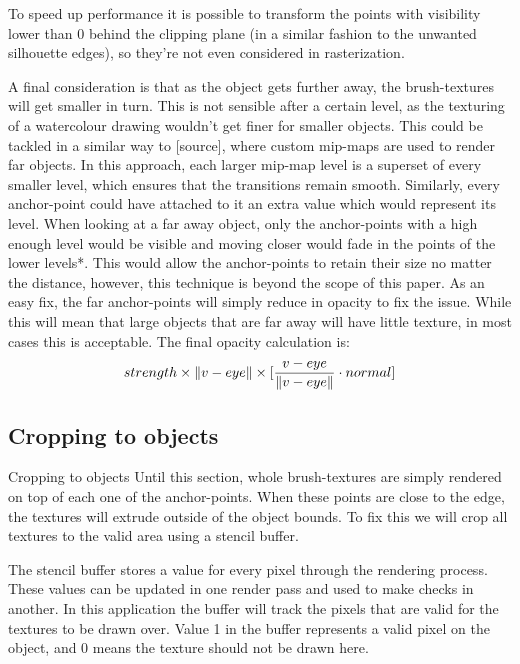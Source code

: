 \documentclass[a4paper, 12pt]{article}
\DeclarePairedDelimiter{\norm}{\lVert}{\rVert}
\begin{document}
To speed up performance it is possible to transform the points with visibility lower than 0 behind the clipping plane (in a similar fashion to the unwanted silhouette edges), so they're not even considered in rasterization.

A final consideration is that as the object gets further away, the brush-textures will get smaller in turn. This is not sensible after a certain level, as the texturing of a watercolour drawing wouldn't get finer for smaller objects. This could be tackled in a similar way to [source], where custom mip-maps are used to render far objects. In this approach, each larger mip-map level is a superset of every smaller level, which ensures that the transitions remain smooth. Similarly, every anchor-point could have attached to it an extra value which would represent its level. When looking at a far away object, only the anchor-points with a high enough level would be visible and moving closer would fade in the points of the lower levels*. This would allow the anchor-points to retain their size no matter the distance, however, this technique is beyond the scope of this paper. As an easy fix, the far anchor-points will simply reduce in opacity to fix the issue. While this will mean that large objects that are far away will have little texture, in most cases this is acceptable. The final opacity calculation is:
$$strength \times \norm{v-eye} \times [\frac{v-eye}{\norm{v-eye}} \cdot normal]$$


\subsection{Cropping to objects}
Cropping to objects
Until this section, whole brush-textures are simply rendered on top of each one of the anchor-points. When these points are close to the edge, the textures will extrude outside of the object bounds. To fix this we will crop all textures to the valid area using a stencil buffer.

The stencil buffer stores a value for every pixel through the rendering process. These values can be updated in one render pass and used to make checks in another. In this application the buffer will track the pixels that are valid for the textures to be drawn over. Value 1 in the buffer represents a valid pixel on the object, and 0 means the texture should not be drawn here.
\end{document}
